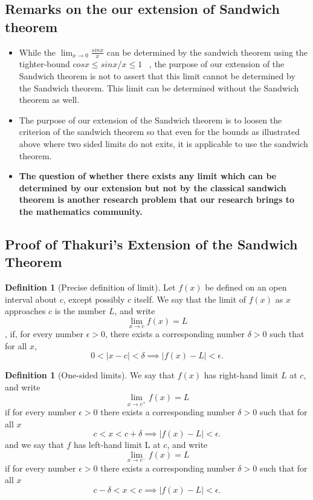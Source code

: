 \documentclass[a4paper,twoside,12pt]{article}
\theoremstyle{plain}
\theoremstyle{definition}
\newtheorem{definition}[theorem]{Definition}
\theoremstyle{theorem}
\begin{document}
{ \subsection{Remarks on the our extension of Sandwich theorem}
 \begin{itemize}
 \item  While the \(\displaystyle \lim_{x \to 0} \frac{sinx}{x}\) can be determined by the sandwich theorem using the tighter-bound $cosx \leq sinx/x \leq 1$ ~\cite{boules}, the purpose of our extension of the Sandwich theorem is not to assert that this limit cannot be determined by the Sandwich theorem. This limit can be determined without the Sandwich theorem as well.

 \item The purpose of our extension of the Sandwich theorem is to loosen the criterion of the sandwich theorem so that even for the bounds as illustrated above where two sided limits do not exits, it is applicable to use the sandwich theorem.

\item \textbf{The question of whether there exists any limit which can be determined by our extension but not by the classical sandwich theorem is another research problem that our research brings to the mathematics community.}
 \end{itemize}

\vspace{5mm}
 \subsection{Proof of Thakuri's Extension of the Sandwich Theorem}

 \begin{definition}[Precise definition of limit] \cite{thomas}
     Let $f(x)$ be defined on an open interval about $c$, except possibly $c$ itself. We say that the limit of $f(x)$ as $x$ approaches $c$ is the number $L$, and write $$\lim_{x \to c} f(x)=L$$,
     if, for every number $\epsilon > 0$, there exists a corresponding number $\delta >0$ such that for all $x$, \[0<|x-c|< \delta \implies |f(x)-L|<\epsilon .\]
 \end{definition}

 \begin{definition}[One-sided limits] \cite{thomas}
 We say that $f(x)$ has right-hand limit $L$ at $c$, and write $$\lim_{x \to c^+} f(x) = L$$
 if for every number $\epsilon >0$ there exists a corresponding number $\delta >0$ such that for all $x$ $$c<x<c+\delta \implies |f(x) - L| < \epsilon .$$ and we say that $f$ has left-hand limit L at $c$, and write $$\lim_{x \to c^-} f(x) = L$$
 if for every number $\epsilon >0$ there exists a corresponding number $\delta >0$ such that for all $x$ $$c - \delta<x<c \implies |f(x) - L| < \epsilon .$$
 \end{definition}
\vspace{5mm}

}
\end{document}
